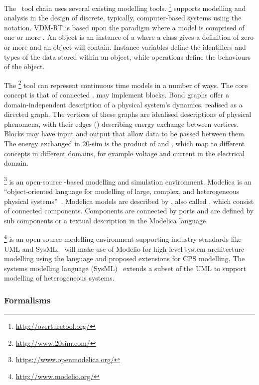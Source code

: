The \into\ tool chain uses several existing modelling tools. \footnote{\url{http://overturetool.org/}} supports modelling and analysis in the design of discrete, typically, computer-based systems using the  notation. VDM-RT is based upon the  paradigm where a model is comprised of one or more . An object is an instance of a  where a class gives a definition of zero or more  and  an object will contain. Instance variables define the identifiers and types of the data stored within an object, while operations define the behaviours of the object.

The \footnote{\url{http://www.20sim.com/}} tool can represent continuous time models in a number of ways. The core concept is that of connected .    may implement blocks. Bond graphs offer a domain-independent description of a physical system's dynamics, realised as a directed graph. The vertices of these graphs are idealised descriptions of physical phenomena, with their edges () describing energy exchange between vertices. Blocks may have input and output  that allow data to be passed between them. The energy exchanged in 20-sim is the product of  and , which map to different concepts in different domains, for example voltage and current in the electrical domain.

\footnote{\url{https://www.openmodelica.org/}}  is an open-source -based modelling and simulation environment. Modelica is an ``object-oriented language for modelling of large, complex, and heterogeneous physical systems''~\cite{Fritzson&98}. Modelica models are described by , also called , which consist of connected components. Components are connected by ports and are defined by sub components or a textual description in the Modelica language.

\footnote{\url{http://www.modelio.org/}} is an open-source modelling environment supporting industry standards like UML and SysML. \into\ will make use of Modelio for high-level system architecture modelling using the  language and proposed extensions for CPS modelling. The systems modelling language (SysML)~\cite{SysML12}  extends a subset of the UML to support modelling of heterogeneous systems.

\subsubsection{Formalisms}
\label{sec:concepts:formal}

